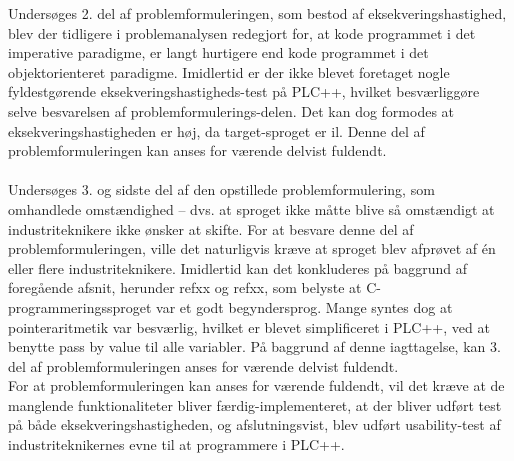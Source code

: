 \noindent Undersøges 2. del af problemformuleringen, som bestod af eksekveringshastighed, blev der tidligere i problemanalysen redegjort for, at kode programmet i det imperative paradigme, er langt hurtigere end kode programmet i det objektorienteret paradigme. Imidlertid er der ikke blevet foretaget nogle fyldestgørende eksekveringshastigheds-test på PLC++, hvilket besværliggøre selve besvarelsen af problemformulerings-delen. Det kan dog formodes at eksekveringshastigheden er høj, da target-sproget er \gls{il}. Denne del af problemformuleringen kan anses for værende delvist fuldendt. \\\\

\noindent Undersøges 3. og sidste del af den opstillede problemformulering, som omhandlede omstændighed – dvs. at sproget ikke måtte blive så omstændigt at industriteknikere ikke ønsker at skifte. 
For at besvare denne del af problemformuleringen, ville det naturligvis kræve at sproget blev afprøvet af én eller flere industriteknikere. Imidlertid kan det konkluderes på baggrund af foregående afsnit, herunder refxx og refxx, som belyste at C-programmeringssproget var et godt begyndersprog. Mange syntes dog at pointeraritmetik var besværlig, hvilket er blevet simplificeret i PLC++, ved at benytte pass by value til alle variabler. På baggrund af denne iagttagelse, kan 3. del af problemformuleringen anses for værende delvist fuldendt. \\

\noindent For at problemformuleringen kan anses for værende fuldendt, vil det kræve at de manglende funktionaliteter bliver færdig-implementeret, at der bliver udført test på både eksekveringshastigheden, og afslutningsvist, blev udført usability-test af industriteknikernes evne til at programmere i PLC++.








